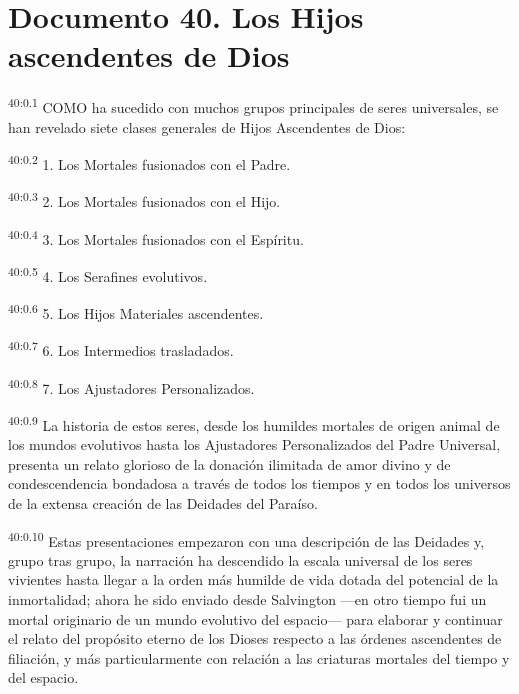 \chapter{Documento 40. Los Hijos ascendentes de Dios}
\par
\textsuperscript{40:0.1} COMO ha sucedido con muchos grupos principales de seres universales, se han revelado siete clases generales de Hijos Ascendentes de Dios:

\par
\textsuperscript{40:0.2} 1. Los Mortales fusionados con el Padre.

\par
\textsuperscript{40:0.3} 2. Los Mortales fusionados con el Hijo.

\par
\textsuperscript{40:0.4} 3. Los Mortales fusionados con el Espíritu.

\par
\textsuperscript{40:0.5} 4. Los Serafines evolutivos.

\par
\textsuperscript{40:0.6} 5. Los Hijos Materiales ascendentes.

\par
\textsuperscript{40:0.7} 6. Los Intermedios trasladados.

\par
\textsuperscript{40:0.8} 7. Los Ajustadores Personalizados.

\par
\textsuperscript{40:0.9} La historia de estos seres, desde los humildes mortales de origen animal de los mundos evolutivos hasta los Ajustadores Personalizados del Padre Universal, presenta un relato glorioso de la donación ilimitada de amor divino y de condescendencia bondadosa a través de todos los tiempos y en todos los universos de la extensa creación de las Deidades del Paraíso.

\par
\textsuperscript{40:0.10} Estas presentaciones empezaron con una descripción de las Deidades y, grupo tras grupo, la narración ha descendido la escala universal de los seres vivientes hasta llegar a la orden más humilde de vida dotada del potencial de la inmortalidad; ahora he sido enviado desde Salvington ---en otro tiempo fui un mortal originario de un mundo evolutivo del espacio--- para elaborar y continuar el relato del propósito eterno de los Dioses respecto a las órdenes ascendentes de filiación, y más particularmente con relación a las criaturas mortales del tiempo y del espacio.

